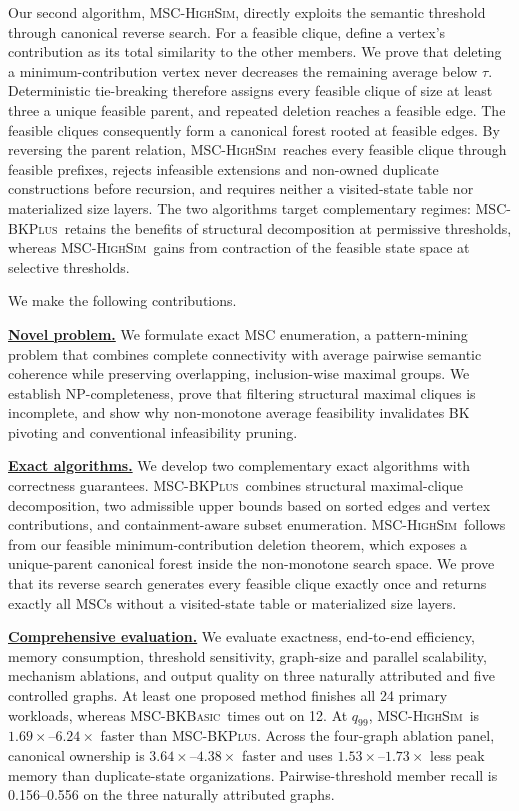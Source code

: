 \documentclass[sigconf, nonacm]{acmart}
\newcommand{\stitleunderline}[1]{\vspace{0.5ex}\noindent\underline{{\bf #1}}}
\newcommand{\semBK}{MSC-\textsc{BKBasic}}
\newcommand{\subEnum}{MSC-\textsc{BKPlus}}
\newcommand{\monoSemMCE}{MSC-\textsc{HighSim}}
\begin{document}
Our second algorithm, \monoSemMCE, directly exploits the semantic threshold
through canonical reverse search. For a feasible clique, define a vertex's
contribution as its total similarity to the other members. We prove that
deleting a minimum-contribution vertex never decreases the remaining average
below $\tau$. Deterministic tie-breaking therefore assigns every feasible
clique of size at least three a unique feasible parent, and repeated deletion
reaches a feasible edge. The feasible cliques consequently form a canonical
forest rooted at feasible edges. By reversing the parent relation,
\monoSemMCE\ reaches every feasible clique through feasible prefixes, rejects
infeasible extensions and non-owned duplicate constructions before recursion,
and requires neither a visited-state table nor materialized size layers. The
two algorithms target complementary regimes: \subEnum\ retains the benefits of
structural decomposition at permissive thresholds, whereas \monoSemMCE\ gains
from contraction of the feasible state space at selective thresholds.

We make the following contributions.

\stitleunderline{Novel problem.}
We formulate exact MSC enumeration, a pattern-mining problem that combines
complete connectivity with average pairwise semantic coherence while preserving
overlapping, inclusion-wise maximal groups. We establish NP-completeness, prove
that filtering structural maximal cliques is incomplete, and show why
non-monotone average feasibility invalidates BK pivoting and conventional
infeasibility pruning.

\stitleunderline{Exact algorithms.}
We develop two complementary exact algorithms with correctness guarantees.
\subEnum\ combines structural maximal-clique decomposition, two admissible
upper bounds based on sorted edges and vertex contributions, and
containment-aware subset enumeration. \monoSemMCE\ follows from our feasible
minimum-contribution deletion theorem, which exposes a unique-parent canonical
forest inside the non-monotone search space. We prove that its reverse search
generates every feasible clique exactly once and returns exactly all MSCs
without a visited-state table or materialized size layers.

\stitleunderline{Comprehensive evaluation.}
We evaluate exactness, end-to-end efficiency, memory consumption, threshold sensitivity,
graph-size and parallel scalability, mechanism ablations, and
output quality on three naturally attributed and five controlled graphs. At
least one proposed method finishes all 24 primary workloads, whereas \semBK\
times out on 12. At $q_{99}$, \monoSemMCE\ is $1.69\times$--$6.24\times$ faster
than \subEnum. Across the four-graph ablation panel, canonical ownership is
$3.64\times$--$4.38\times$ faster and uses $1.53\times$--$1.73\times$ less
peak memory than duplicate-state organizations.
Pairwise-threshold member recall is
0.156--0.556 on the three naturally attributed graphs.
\end{document}

